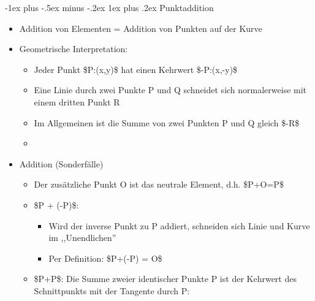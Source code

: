\documentclass[a4paper]{article}
\makeatletter
\renewcommand{\subsubsection}{\@startsection{subsubsection}{3}{0mm}%
 {-1ex plus -.5ex minus -.2ex}%
 {1ex plus .2ex}%
 {\normalfont\small\bfseries}}
\makeatother
\begin{document}
\begin{multicols}{3}
    \subsubsection{Punktaddition}

    \begin{itemize}
        \item
              Addition von Elementen = Addition von Punkten auf der Kurve
        \item
              Geometrische Interpretation:

              \begin{itemize}
                  \item
                        Jeder Punkt \$P:(x,y)\$ hat einen Kehrwert \$-P:(x,-y)\$
                  \item
                        Eine Linie durch zwei Punkte P und Q schneidet sich normalerweise
                        mit einem dritten Punkt R
                  \item
                        Im Allgemeinen ist die Summe von zwei Punkten P und Q gleich \$-R\$
                  \item
              \end{itemize}
        \item
              Addition (Sonderfälle)

              \begin{itemize}
                  \item
                        Der zusätzliche Punkt O ist das neutrale Element, d.h. \$P+O=P\$
                  \item
                        \$P + (-P)\$:

                        \begin{itemize}
                            \item
                                  Wird der inverse Punkt zu P addiert, schneiden sich Linie und
                                  Kurve im ,,Unendlichen''
                            \item
                                  Per Definition: \$P+(-P) = O\$
                        \end{itemize}
                  \item
                        \$P+P\$: Die Summe zweier identischer Punkte P ist der Kehrwert des
                        Schnittpunkts mit der Tangente durch P:


\end{itemize}
\end{itemize}
\end{multicols}
\end{document}

